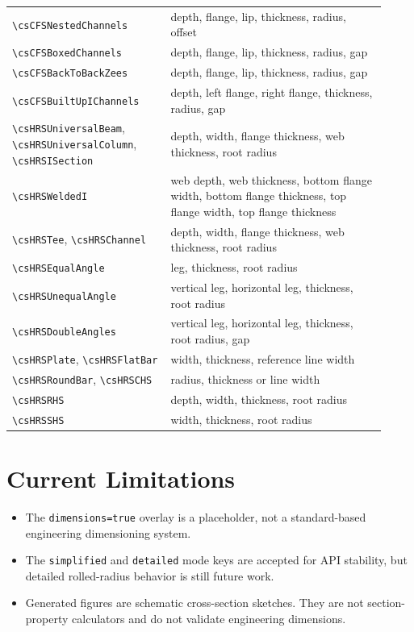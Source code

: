 \documentclass[10pt]{article}
\newcommand{\smallcommand}[1]{{\scriptsize\texttt{\textbackslash #1}}}
\newcommand{\keyname}[1]{\texttt{#1}}
\begin{document}
\begin{footnotesize}
\begin{longtable}{@{}L{0.39\linewidth}L{0.53\linewidth}@{}}
\smallcommand{csCFSNestedChannels} & depth, flange, lip, thickness, radius, offset \\
\smallcommand{csCFSBoxedChannels} & depth, flange, lip, thickness, radius, gap \\
\smallcommand{csCFSBackToBackZees} & depth, flange, lip, thickness, radius, gap \\
\smallcommand{csCFSBuiltUpIChannels} & depth, left flange, right flange, thickness, radius, gap \\
\smallcommand{csHRSUniversalBeam}, \smallcommand{csHRSUniversalColumn}, \smallcommand{csHRSISection} & depth, width, flange thickness, web thickness, root radius \\
\smallcommand{csHRSWeldedI} & web depth, web thickness, bottom flange width, bottom flange thickness, top flange width, top flange thickness \\
\smallcommand{csHRSTee}, \smallcommand{csHRSChannel} & depth, width, flange thickness, web thickness, root radius \\
\smallcommand{csHRSEqualAngle} & leg, thickness, root radius \\
\smallcommand{csHRSUnequalAngle} & vertical leg, horizontal leg, thickness, root radius \\
\smallcommand{csHRSDoubleAngles} & vertical leg, horizontal leg, thickness, root radius, gap \\
\smallcommand{csHRSPlate}, \smallcommand{csHRSFlatBar} & width, thickness, reference line width \\
\smallcommand{csHRSRoundBar}, \smallcommand{csHRSCHS} & radius, thickness or line width \\
\smallcommand{csHRSRHS} & depth, width, thickness, root radius \\
\smallcommand{csHRSSHS} & width, thickness, root radius \\
\bottomrule
\end{longtable}
\end{footnotesize}

\section{Current Limitations}

\begin{itemize}
  \item The \keyname{dimensions=true} overlay is a placeholder, not a
  standard-based engineering dimensioning system.
  \item The \keyname{simplified} and \keyname{detailed} mode keys are accepted
  for API stability, but detailed rolled-radius behavior is still future work.
  \item Generated figures are schematic cross-section sketches. They are not
  section-property calculators and do not validate engineering dimensions.
\end{itemize}
\end{document}
